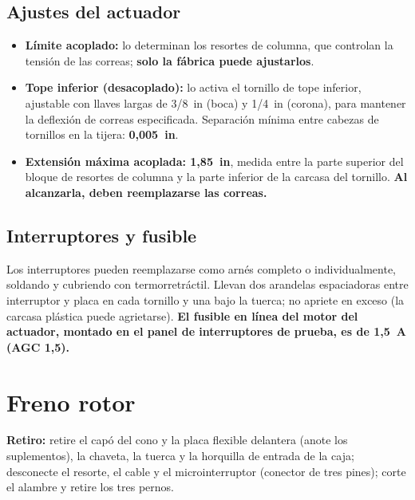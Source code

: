 \subsection{Ajustes del actuador}

\begin{itemize}
\item \textbf{Límite acoplado:} lo determinan los resortes de columna, que controlan la tensión de las correas; \textbf{solo la fábrica puede ajustarlos}.
\item \textbf{Tope inferior (desacoplado):} lo activa el tornillo de tope inferior, ajustable con llaves largas de 3/8~in (boca) y 1/4~in (corona), para mantener la deflexión de correas especificada. Separación mínima entre cabezas de tornillos en la tijera: \textbf{0,005~in}.
\item \textbf{Extensión máxima acoplada: 1,85~in}, medida entre la parte superior del bloque de resortes de columna y la parte inferior de la carcasa del tornillo. \textbf{Al alcanzarla, deben reemplazarse las correas.}
\end{itemize}

\subsection{Interruptores y fusible}

Los interruptores pueden reemplazarse como arnés completo o individualmente, soldando y cubriendo con termorretráctil. Llevan dos arandelas espaciadoras entre interruptor y placa en cada tornillo y una bajo la tuerca; no apriete en exceso (la carcasa plástica puede agrietarse). \textbf{El fusible en línea del motor del actuador, montado en el panel de interruptores de prueba, es de 1,5~A (AGC 1,5).}

\section{Freno rotor}

\textbf{Retiro:} retire el capó del cono y la placa flexible delantera (anote los suplementos), la chaveta, la tuerca y la horquilla de entrada de la caja; desconecte el resorte, el cable y el microinterruptor (conector de tres pines); corte el alambre y retire los tres pernos.

